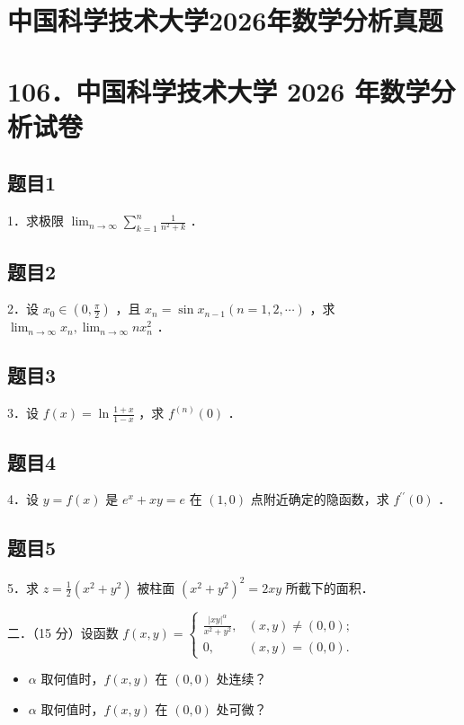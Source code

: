\documentclass{article}
\begin{document}
\section*{中国科学技术大学2026年数学分析真题}
\section*{106．中国科学技术大学 2026 年数学分析试卷}

\subsection{题目1}
1．求极限 \(\lim _{n \rightarrow \infty} \sum_{k=1}^{n} \frac{1}{n^{2}+k}\) ．

\subsection{题目2}
2．设 \(x_{0} \in\left(0, \frac{\pi}{2}\right)\) ，且 \(x_{n}=\sin x_{n-1}(n=1,2, \cdots)\) ，求 \(\lim _{n \rightarrow \infty} x_{n}, \lim _{n \rightarrow \infty} n x_{n}^{2}\) ．

\subsection{题目3}
3．设 \(f(x)=\ln \frac{1+x}{1-x}\) ，求 \(f^{(n)}(0)\) ．

\subsection{题目4}
4．设 \(y=f(x)\) 是 \(e^{x}+x y=e\) 在 \((1,0)\) 点附近确定的隐函数，求 \(f^{\prime \prime}(0)\) ．

\subsection{题目5}
5．求 \(z=\frac{1}{2}\left(x^{2}+y^{2}\right)\) 被柱面 \(\left(x^{2}+y^{2}\right)^{2}=2 x y\) 所截下的面积．

二．（15 分）设函数 \(f(x, y)= \begin{cases}\frac{|x y|^{\alpha}}{x^{2}+y^{2}}, & (x, y) \neq(0,0) ; \\ 0, & (x, y)=(0,0) .\end{cases}\)

\begin{itemize}
  \item[（1）] \(\alpha\) 取何值时，\(f(x, y)\) 在 \((0,0)\) 处连续？
  \item[（2）] \(\alpha\) 取何值时，\(f(x, y)\) 在 \((0,0)\) 处可微？
\end{itemize}
\end{document}

